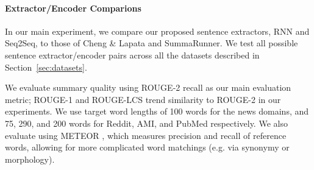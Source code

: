 \paragraph{Extractor/Encoder Comparions}{
In our main experiment, we compare our proposed 
sentence extractors, RNN and Seq2Seq,
to those of Cheng \& Lapata and SummaRunner.
We test all possible sentence extractor/encoder pairs across all the datasets
described in Section~\ref{sec:datasets}.} 






We evaluate summary quality using ROUGE-2 recall \cite{lin2004rouge} 
as our main evaluation metric;
ROUGE-1 and ROUGE-LCS trend similarity to ROUGE-2 in our experiments.
We use target word lengths of 100 words for the news domains, and 
75, 290, and 200 words for Reddit, AMI, and PubMed respectively.
We also evaluate using METEOR \cite{denkowski:lavie:meteor-wmt:2014},
which measures precision and recall of reference words, allowing for
more complicated word matchings (e.g. via synonymy or morphology).




